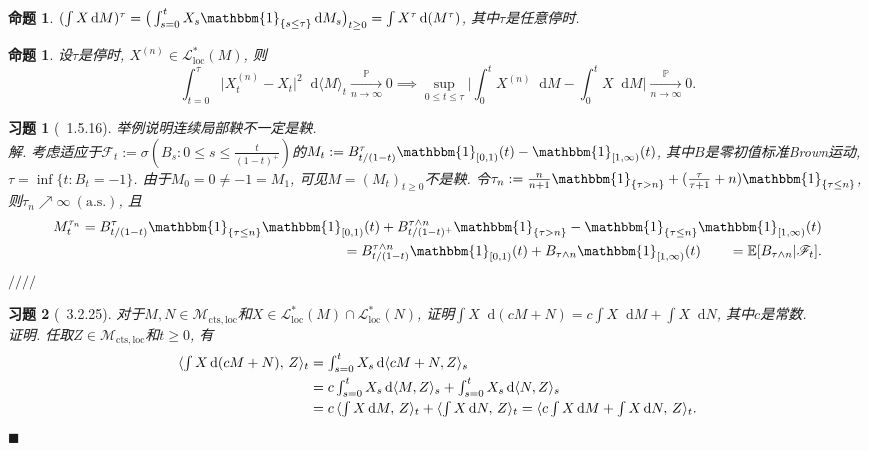 \documentclass{ctexart}
\theoremstyle{definition}
\theoremstyle{remark}
\theoremstyle{plain}
\newtheorem{Prop}[Def]{命题}
\newtheorem{Ex}{习题}[section]
\newenvironment{Soln}{\vspace{1ex}\textbf{\\}{\color{red}\textit{解}}.\normalfont}{\color{red}\hfill$/\!/\!/\!/$\vspace{1ex}\par}
\newenvironment{Prf}{\vspace{1ex}\textbf{\\}{\color{red}\textit{证明}}.\normalfont}{\color{red}\hfill$\blacksquare$\vspace{1ex}\par}
\newcommand{\1}{\mathbbm{1}}				%
\newcommand{\as}{\mathrm{a.s.}}				%
\renewcommand{\P}{\mathbb{P}}				%
\newcommand{\E}{\mathbb{E}}					%
\newcommand{\agp}[1]{\langle #1 \rangle}	%
\newcommand{\abs}[1]{\lvert#1\rvert}			%
\newcommand{\tint}{\textstyle\int\nolimits}
\renewcommand*{\d}{\mathop{}\!\mathrm{d}}	%
\begin{document}
\begin{Prop}
$(\int X \d M)^{\tau} = \big(\int_{s=0}^{t} X_{s} \1_{\{s\le\tau\}} \d M_{s}\big)_{t \ge 0} = \int X^{\tau} \d (M^{\tau})$, 其中$\tau$是任意停时.
\end{Prop}

\begin{Prop}
设$\tau$是停时, $X^{(n)} \in \mathcal{L}_{\mathrm{loc}}^{*}(M)$, 则
\[ \tint_{t=0}^{\tau} \abs{X_{t}^{(n)}-X_{t}}^{2} \d\agp{M}_{t} \xrightarrow[n\to\infty]{\P} 0 \implies \sup\limits_{0 \le t \le \tau} \abs{ \tint_{0}^{t} X^{(n)} \d M - \tint_{0}^{t} X \d M } \xrightarrow[n\to\infty]{\P} 0 . \]
\end{Prop}


\begin{Ex}[\cite{Karatzas-Shreve--GTM113}~1.5.16]
举例说明连续局部鞅不一定是鞅.
\begin{Soln}
考虑适应于$\mathscr{F}_{t} := \sigma(B_{s} : 0 \le s \le \frac{t}{(1-t)^{+}})$的$M_{t} := B^{\tau}_{t/(1-t)} \1_{[0,1)}(t) - \1_{[1,\infty)}(t)$, 其中$B$是零初值标准Brown运动, $\tau = \inf\{ t : B_{t} = -1 \}$. 由于$M_{0} = 0 \neq -1 = M_{1}$, 可见$M = (M_{t})_{t \ge 0}$不是鞅. 令$\tau_{n} := \frac{n}{n+1}\1_{\{\tau>n\}} + (\frac{\tau}{\tau+1}+n) \1_{\{\tau \le n\}}$, 则$\tau_{n} \nearrow \infty ~(\as)$, 且
\[\begin{aligned}
M_{t}^{\tau_{n}} = B^{\tau}_{t/(1-t)} \1_{\{\tau \le n\}} \1_{[0,1)}(t) + B^{\tau\wedge n}_{t/(1-t)^{+}} \1_{\{\tau > n\}} - \1_{\{\tau \le n\}} \1_{[1,\infty)}(t) \\
= B^{\tau\wedge n}_{t/(1-t)} \1_{[0,1)}(t) + B_{\tau\wedge n} \1_{[1,\infty)}(t) \qquad
= \E[B_{\tau\wedge n} |\mathscr{F}_{t}] .
\end{aligned}\vspace{-4.36ex}\]
\end{Soln}
\end{Ex}


\begin{Ex}[\cite{Karatzas-Shreve--GTM113}~3.2.25]
对于$M,N \in \mathcal{M}_{\mathrm{cts},\mathrm{loc}}$和$X \in \mathcal{L}_{\mathrm{loc}}^{*}(M) \cap \mathcal{L}_{\mathrm{loc}}^{*}(N)$, 证明$\int X \d (cM+N) = c \int X \d M + \int X \d N$, 其中$c$是常数.
\begin{Prf}
任取$Z \in \mathcal{M}_{\mathrm{cts},\mathrm{loc}}$和$t \ge 0$, 有
\[\begin{aligned}
\agp{\tint X \d (cM+N) ,\, Z}_{t} &= \tint_{s=0}^{t} X_{s} \d\agp{cM+N,Z}_{s} \\
&= c \tint_{s=0}^{t} X_{s} \d\agp{M,Z}_{s} + \tint_{s=0}^{t} X_{s} \d\agp{N,Z}_{s} \\
&= c\, \agp{\tint X \d M ,\, Z}_{t} + \agp{\tint X \d N ,\, Z}_{t} 
= \agp{ c \tint X \d M + \tint X \d N ,\, Z}_{t} .
\end{aligned}\vspace{-4ex}\]
\end{Prf}
\end{Ex}
\end{document}
